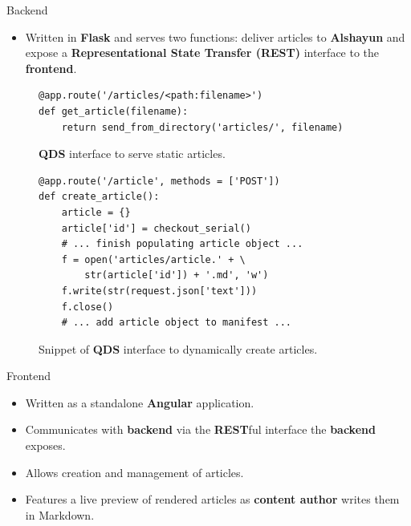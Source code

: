 \documentclass{beamer}
\begin{document}
\begin{frame}{Backend}
    \begin{itemize}
        \item Written in \textbf{Flask} and serves two functions: deliver
            articles to \textbf{Alshayun} and expose a \textbf{Representational
            State Transfer (REST)} interface to the \textbf{frontend}.
    \end{itemize}
    \begin{figure}
    \begin{verbatim}
@app.route('/articles/<path:filename>')
def get_article(filename):
    return send_from_directory('articles/', filename)
    \end{verbatim}
    \caption{\textbf{QDS} interface to serve static articles.}
    \end{figure}
    \begin{figure}
    \begin{verbatim}
@app.route('/article', methods = ['POST'])
def create_article():
    article = {}
    article['id'] = checkout_serial()
    # ... finish populating article object ...
    f = open('articles/article.' + \
        str(article['id']) + '.md', 'w')
    f.write(str(request.json['text']))
    f.close()
    # ... add article object to manifest ...
    \end{verbatim}
    \caption{Snippet of \textbf{QDS} interface to dynamically create articles.}
    \end{figure}
\end{frame}

\begin{frame}{Frontend}
    \begin{itemize}
        \item Written as a standalone \textbf{Angular} application.
        \item Communicates with \textbf{backend} via the \textbf{REST}ful
            interface the \textbf{backend} exposes.
        \item Allows creation and management of articles.
        \item Features a live preview of rendered articles as \textbf{content
            author} writes them in Markdown.
    \end{itemize}
\end{frame}
\end{document}
